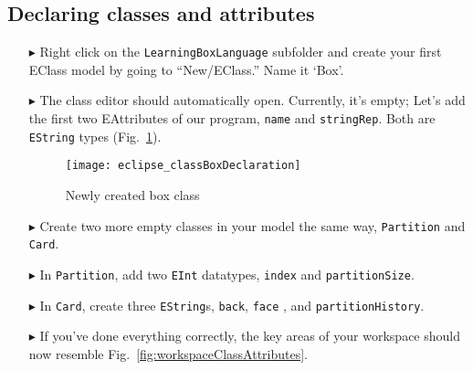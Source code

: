 \newpage
\subsection{Declaring classes and attributes}
\texHeader
\hypertarget{static:classes tex}{}

\begin{itemize}

\item[$\blacktriangleright$] Right click on the \texttt{LearningBoxLanguage} subfolder and create your first EClass model by going to ``New/EClass.'' Name it `Box'.

\vspace{0.5cm}

\item[$\blacktriangleright$] The class editor should automatically open. Currently, it's empty; Let's add the first two EAttributes of our program,
\texttt{name} and \texttt{stringRep}. Both are \texttt{EString} types (Fig.~\ref{fig:boxDeclaration}).

\vspace{0.5cm}

\begin{figure}[htbp]
	\centering
  \texttt{[image: eclipse\_classBoxDeclaration]}
	\caption{Newly created box class}
	\label{fig:boxDeclaration}
\end{figure} 

\item[$\blacktriangleright$] Create two more empty classes in your model the same way, \texttt{Partition} and \texttt{Card}.

\vspace{0.5cm}

\item[$\blacktriangleright$] In \texttt{Partition}, add two \texttt{EInt} datatypes, \texttt{index} and \texttt{partitionSize}.

\vspace{0.5cm}

\item[$\blacktriangleright$] In \texttt{Card}, create three \texttt{EString}s, \texttt{back}, \texttt{face} , and \texttt{partitionHistory}.

\vspace{0.5cm}

\item[$\blacktriangleright$] If you've done everything correctly, the key areas of your workspace should now resemble Fig.~\ref{fig:workspaceClassAttributes}.


\end{itemize}
